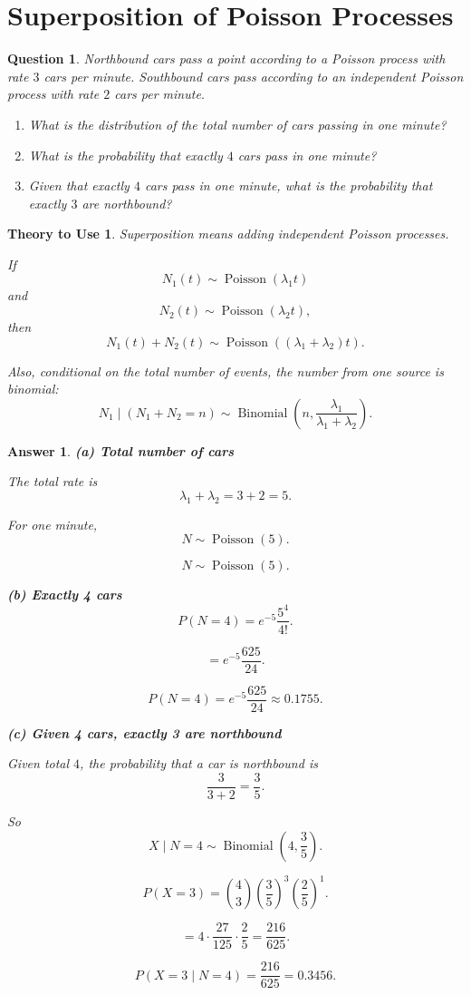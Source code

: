 \documentclass[12pt]{article}
\newtheorem{question}{Question}
\newtheorem*{theory}{Theory to Use}
\newtheorem*{answer}{Answer}
\begin{document}
\section{Superposition of Poisson Processes}

\begin{question}
Northbound cars pass a point according to a Poisson process with rate \(3\) cars per minute.
Southbound cars pass according to an independent Poisson process with rate \(2\) cars per minute.
\begin{enumerate}[label=(\alph*)]
    \item What is the distribution of the total number of cars passing in one minute?
    \item What is the probability that exactly \(4\) cars pass in one minute?
    \item Given that exactly \(4\) cars pass in one minute, what is the probability that exactly \(3\) are northbound?
\end{enumerate}
\end{question}

\begin{theory}
Superposition means adding independent Poisson processes.

If
\[
N_1(t)\sim \operatorname{Poisson}(\lambda_1 t)
\]
and
\[
N_2(t)\sim \operatorname{Poisson}(\lambda_2 t),
\]
then
\[
N_1(t)+N_2(t)\sim \operatorname{Poisson}((\lambda_1+\lambda_2)t).
\]

Also, conditional on the total number of events, the number from one source is binomial:
\[
N_1\mid (N_1+N_2=n)\sim \operatorname{Binomial}\left(n,\frac{\lambda_1}{\lambda_1+\lambda_2}\right).
\]
\end{theory}

\begin{answer}
\textbf{(a) Total number of cars}

The total rate is
\[
\lambda_1+\lambda_2=3+2=5.
\]

For one minute,
\[
N\sim \operatorname{Poisson}(5).
\]

\[
\boxed{N\sim \operatorname{Poisson}(5).}
\]

\textbf{(b) Exactly 4 cars}
\[
P(N=4)=e^{-5}\frac{5^4}{4!}.
\]

\[
=e^{-5}\frac{625}{24}.
\]

\[
\boxed{P(N=4)=e^{-5}\frac{625}{24}\approx 0.1755.}
\]

\textbf{(c) Given 4 cars, exactly 3 are northbound}

Given total \(4\), the probability that a car is northbound is
\[
\frac{3}{3+2}=\frac{3}{5}.
\]

So
\[
X\mid N=4\sim \operatorname{Binomial}\left(4,\frac{3}{5}\right).
\]

\[
P(X=3)=\binom{4}{3}\left(\frac{3}{5}\right)^3\left(\frac{2}{5}\right)^1.
\]

\[
=4\cdot \frac{27}{125}\cdot \frac{2}{5}
=\frac{216}{625}.
\]

\[
\boxed{P(X=3\mid N=4)=\frac{216}{625}=0.3456.}
\]
\end{answer}
\end{document}
